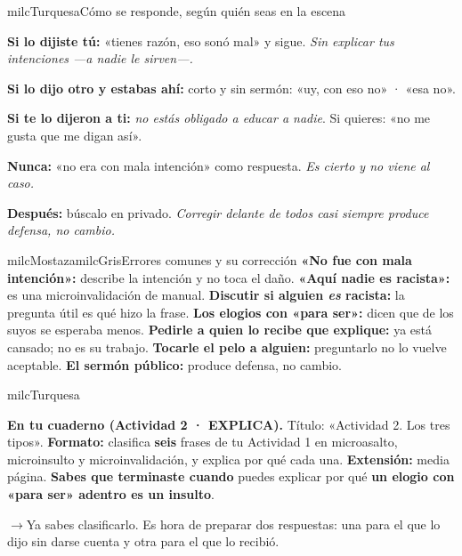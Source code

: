 \documentclass[11pt,letterpaper]{article}
\newcommand{\puente}[1]{%
  \begin{puentebox}%
    \textcolor{milcGradeDark}{$\rightarrow$}\hspace{2mm}#1%
  \end{puentebox}%
}
\begin{document}
\begin{drawbox}{milcTurquesa}{Cómo se responde, según quién seas en la escena}
\begin{pasoslista}
\item \textbf{Si lo dijiste tú:} «tienes razón, eso sonó mal» y sigue. \emph{Sin explicar tus intenciones ---a nadie le sirven---.}
\item \textbf{Si lo dijo otro y estabas ahí:} corto y sin sermón: «uy, con eso no» · «esa no».
\item \textbf{Si te lo dijeron a ti:} \emph{no estás obligado a educar a nadie}. Si quieres: «no me gusta que me digan así».
\item \textbf{Nunca:} «no era con mala intención» como respuesta. \emph{Es cierto y no viene al caso.}
\item \textbf{Después:} búscalo en privado. \emph{Corregir delante de todos casi siempre produce defensa, no cambio.}
\end{pasoslista}
\end{drawbox}

\begin{softbox}{milcMostaza}{milcGris}{Errores comunes y su corrección}
\textbf{«No fue con mala intención»:} describe la intención y no toca el daño. \textbf{«Aquí nadie es racista»:} es una microinvalidación de manual. \textbf{Discutir si alguien \emph{es} racista:} la pregunta útil es qué hizo la frase. \textbf{Los elogios con «para ser»:} dicen que de los suyos se esperaba menos. \textbf{Pedirle a quien lo recibe que explique:} ya está cansado; no es su trabajo. \textbf{Tocarle el pelo a alguien:} preguntarlo no lo vuelve aceptable. \textbf{El sermón público:} produce defensa, no cambio.
\end{softbox}

\begin{infoband}{milcTurquesa}


\textbf{En tu cuaderno (Actividad 2 · EXPLICA).} Título: «Actividad 2. Los tres tipos». \textbf{Formato:} clasifica \textbf{seis} frases de tu Actividad 1 en microasalto, microinsulto y microinvalidación, y explica por qué cada una. \textbf{Extensión:} media página. \textbf{Sabes que terminaste cuando} puedes explicar por qué \textbf{un elogio con «para ser» adentro es un insulto}.
\end{infoband}

\puente{Ya sabes clasificarlo. Es hora de preparar dos respuestas: una para el que lo dijo sin darse cuenta y otra para el que lo recibió.}
\end{document}
